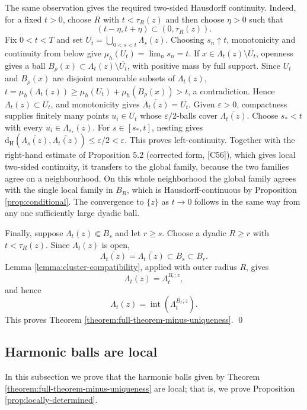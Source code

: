 \documentclass[12pt]{amsart}
\numberwithin{equation}{section}
\newcommand{\cluster}[2]{\hyperref[eq:non-co-set]{\mathit{\Lambda}^{#1}_{#2}}}
\newcommand{\regcluster}[2]{\hyperref[eq:regular-cluster]{\Lambda^{#1}_{#2}}}
\begin{document}
	The same observation gives the required two-sided Hausdorff continuity. Indeed, for a fixed $t>0$, choose $R$ with $t<\tau_R(z)$ and then choose $\eta>0$ such that
	\[
	 (t-\eta,t+\eta)\subset(0,\tau_R(z)).
	\]
	Fix $0<t<T$ and set $U_t=\bigcup_{0<s<t}{\cluster{}{s}}(z)$. Choosing $s_n\uparrow t$, monotonicity and continuity from below give
	$\mu_h(U_t)=\lim_n s_n=t$. If $x\in{\cluster{}{t}}(z)\setminus\overline{U_t}$, openness gives a ball $B_\rho(x)\subset{\cluster{}{t}}(z)\setminus\overline{U_t}$,
	with positive mass by full support. Since $U_t$ and $B_\rho(x)$ are disjoint measurable subsets of ${\cluster{}{t}}(z)$,
	$t=\mu_h({\cluster{}{t}}(z))\ge\mu_h(U_t)+\mu_h(B_\rho(x))>t$, a contradiction. Hence ${\cluster{}{t}}(z)\subset\overline{U_t}$, and
	monotonicity gives $\overline{{\cluster{}{t}}(z)}=\overline{U_t}$. Given $\varepsilon>0$, compactness supplies finitely many points
	$u_i\in U_t$ whose $\varepsilon/2$-balls cover $\overline{{\cluster{}{t}}(z)}$. Choose $s_*<t$ with every $u_i\in{\cluster{}{s_*}}(z)$.
	For $s\in[s_*,t]$, nesting gives $\mathrm{d}_{\mathrm H}(\overline{{\cluster{}{s}}(z)},\overline{{\cluster{}{t}}(z)})\le\varepsilon/2<\varepsilon$.
	This proves left-continuity. Together with the right-hand estimate of Proposition 5.2 (corrected form, [C56]), which gives local
	two-sided continuity, it transfers to the global family, because the two families agree on a neighbourhood.
	On this whole neighborhood the global family agrees with the single local family in $B_R$, which is Hausdorff-continuous by Proposition \ref{prop:conditional}. The convergence to $\{z\}$ as $t\to0$ follows in the same way from any one sufficiently large dyadic ball.

	Finally, suppose ${\regcluster{}{t}}(z)\Subset B_s$ and let $r\geq s$. Choose a dyadic $R\geq r$ with $t<\tau_R(z)$. Since ${\cluster{}{t}}(z)$ is open,
	\[
	 \overline{{\cluster{}{t}}(z)}
	 =\overline{{\regcluster{}{t}}(z)}\subset B_s\subset B_r.
	\]
	Lemma \ref{lemma:cluster-compatibility}, applied with outer radius $R$, gives
	\[
	 {\cluster{}{t}}(z)=\cluster{B_r;z}{t},
	\]
	and hence
	\[
	 {\regcluster{}{t}}(z)=\operatorname{int}\left(\overline{\cluster{B_r;z}{t}}\right).
	\]
	This proves Theorem \ref{theorem:full-theorem-minus-uniqueness}. \qed
	
	
	\subsection{Harmonic balls are local}
	In this subsection we prove that the harmonic balls given by Theorem \ref{theorem:full-theorem-minus-uniqueness} are local; that is, 
	we prove Proposition \ref{prop:locally-determined}. 
	
\end{document}
